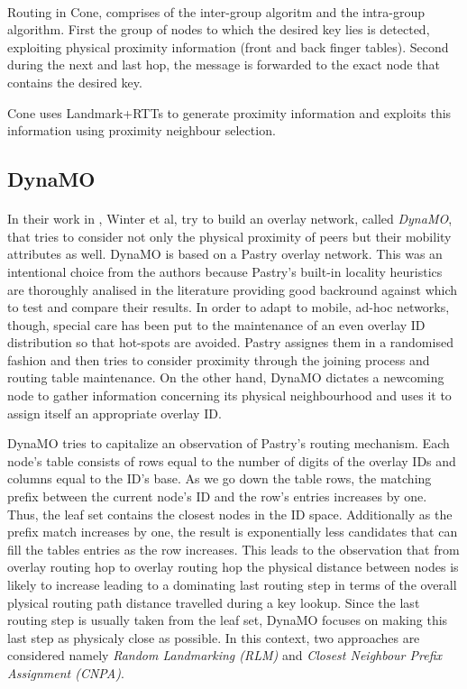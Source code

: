 \documentclass[a4paper,10pt]{article}
\begin{document}
\paragraph{}
Routing in Cone, comprises of the inter-group algoritm and the intra-group algorithm. First the group of nodes to which the desired key lies is detected, exploiting physical proximity information (front and back finger tables). Second during the next and last hop, the message is forwarded to the exact node that contains the desired key.

Cone uses Landmark+RTTs to generate proximity information and exploits this information using proximity neighbour selection.

\subsection{DynaMO}

\paragraph{}
In their work in \cite{winter_dynamo_2004}, Winter et al, try to build an overlay network, called \emph{DynaMO}, that tries to consider not only the physical proximity of peers but their mobility attributes as well. DynaMO is based on a Pastry overlay network. This was an intentional choice from the authors because Pastry's built-in locality heuristics are thoroughly analised in the literature \cite{castro_proximityp2p_2002} providing good backround against which to test and compare their results.  In order to adapt to mobile, ad-hoc networks, though, special care has been put to the maintenance of an even overlay ID distribution so that hot-spots are avoided. Pastry assignes them in a randomised fashion and then tries to consider proximity through the joining process and routing table maintenance. On the other hand, DynaMO dictates a newcoming node to gather information concerning its physical neighbourhood and uses it to assign itself an appropriate overlay ID.

DynaMO tries to capitalize an observation of Pastry's routing mechanism. Each node's table consists of rows equal to the number of digits of the overlay IDs and columns equal to the ID's base. As we go down the table rows, the matching prefix between the current node's ID and the row's entries increases by one. Thus, the leaf set contains the closest nodes in the ID space. Additionally as the prefix match increases by one, the result is exponentially less candidates that can fill the tables entries as the row increases. This leads to the observation \cite{antony_pastry_2001, castro_proximityp2p_2002} that from overlay routing hop to overlay routing hop the physical distance between nodes is likely to increase leading to a dominating last routing step in terms of the overall plysical routing path distance travelled during a key lookup. Since the last routing step is usually taken from the leaf set, DynaMO focuses on making this last step as physicaly close as possible. In this context, two approaches are considered namely \emph{Random Landmarking (RLM)} and \emph{Closest Neighbour Prefix Assignment (CNPA)}.
\end{document}
